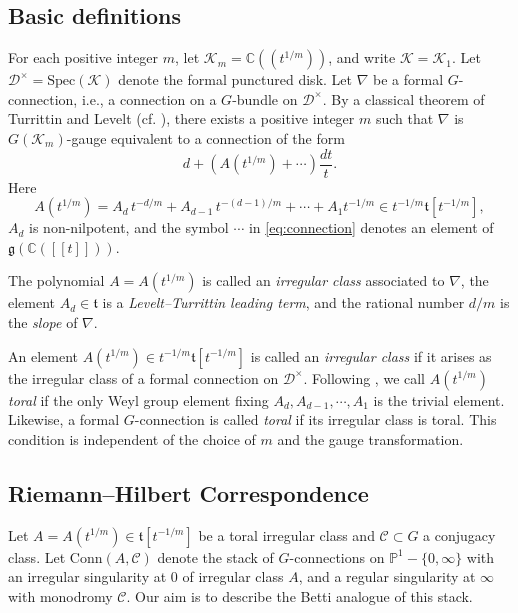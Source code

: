 \documentclass[11pt]{amsart}
\theoremstyle{definition}
\newcommand{\bC}{\mathbb{C}}
\newcommand{\ft}{\mathfrak{t}}
\newcommand{\cC}{\mathcal{C}}
\newcommand{\cK}{\mathcal{K}}
\newcommand{\cD}{\mathcal{D}}
\newcommand{\Conn}{\mathrm{Conn}}
\newcommand{\bP}{\mathbb{P}}
\newcommand{\fg}{\mathfrak{g}}
\begin{document}
\subsection{Basic definitions}

For each positive integer $m$, let $\cK_m=\bC(\!(t^{1/m})\!)$, and write $\cK=\cK_1$. Let $\cD^\times=\mathrm{Spec}(\cK)$ denote the formal punctured disk. Let $\nabla$ be a formal $G$-connection, i.e., a connection on a $G$-bundle on $\cD^\times$. By a classical theorem of Turrittin and Levelt (cf. \cite{BabbittVaradarajan}), there exists a positive integer $m$ such that $\nabla$ is $G(\cK_m)$-gauge equivalent to a connection of the form
\begin{equation}\label{eq:connection}
d+(A(t^{1/m})+\cdots)\frac{dt}{t}.
\end{equation}
Here
\begin{equation} \label{eq:irregular} 
A(t^{1/m})=A_d\,t^{-d/m}+ A_{d-1}\, t^{-(d-1)/m} + \cdots + A_1t^{-1/m}\in t^{-1/m}\ft[t^{-1/m}],
\end{equation}
 $A_d$ is non-nilpotent, and the symbol $\cdots$ in \eqref{eq:connection} denotes an element of $\fg(\bC([\![t]\!]))$. 
 
 
 The polynomial $A=A(t^{1/m})$ is called an \emph{irregular class} associated to $\nabla$, the element $A_d\in \ft$ is a \emph{Levelt--Turrittin leading term}, and the rational number $d/m$ is the \emph{slope} of $\nabla$.


An  element  $A(t^{1/m}) \in t^{-1/m}\ft[t^{-1/m}]$ is called an \emph{irregular class} if it arises as the irregular class of a formal connection on $\cD^\times$. Following \cite{HJ}, we call $A(t^{1/m})$ \emph{toral} if the only Weyl group element fixing $A_d, A_{d-1}, \cdots, A_1$ is the trivial element. Likewise, a formal $G$-connection is called \emph{toral} if its irregular class is toral. This condition is independent of the choice of $m$ and the gauge transformation.






 
 
 
 
  \subsection{Riemann--Hilbert Correspondence} Let $A=A(t^{1/m})\in \ft[t^{-1/m}]$ be a toral irregular class and $\cC\subset G$ a conjugacy class. 
  Let $\Conn(A,\cC)$ denote the stack of $G$-connections on $\bP^1-\{0,\infty\}$ with an irregular singularity at $0$ of irregular class $A$, and a regular singularity at $\infty$ with monodromy $\cC$. Our aim is to describe the Betti analogue of this stack.
  
\end{document}
